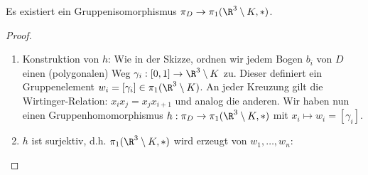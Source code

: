 \begin{st}[Wirtinger, <1900]
    Es existiert ein Gruppenisomorphismus $\pi_D \to \pi_1(\R^3 \setminus K, *)$.
    \begin{proof}
        \begin{enumerate}[1),start=0]
            \item
                Konstruktion von $h$:
                Wie in der Skizze, ordnen wir jedem Bogen $b_i$ von $D$ einen (polygonalen) Weg $\gamma_i: [0,1] \to \R^3 \setminus K$ zu.
                Dieser definiert ein Gruppenelement $w_i = [\gamma_i] \in \pi_1(\R^3 \setminus K)$.
                An jeder Kreuzung gilt die Wirtinger-Relation:
                \begin{math}
                    x_i x_j = x_j x_{i+1}
                \end{math}
                und analog die anderen.
                Wir haben nun einen Gruppenhomomorphismus $h: \pi_D \to \pi_1(\R^3 \setminus K, *)$ mit $x_i \mapsto w_i = [\gamma_i]$.
            \item
                $h$ ist surjektiv, d.h. $\pi_1(\R^3 \setminus K, *)$ wird erzeugt von $w_1, \dotsc, w_n$:


\end{enumerate}
\end{proof}
\end{st}
